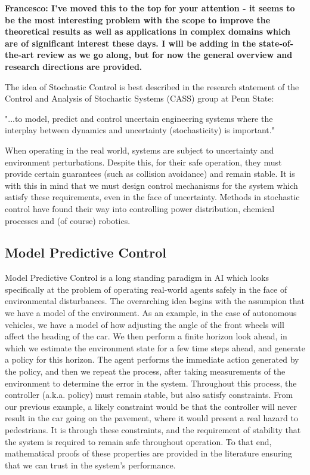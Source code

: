\documentclass[preprint,11pt]{report}
\begin{document}
\textbf{Francesco: I've moved this to the top for your attention - it seems to be the most
interesting problem with the scope to improve the theoretical results as well as applications in
complex domains which are of significant interest these days. I will be adding in the
state-of-the-art review as we go along, but for now the general overview and research directions
are provided.}

The idea of Stochastic Control is best described in the research statement of the Control and
Analysis of Stochastic Systems (CASS) group at Penn State:

\begin{displayquote}
	"...to model, predict and control uncertain engineering systems where the interplay between
	dynamics and uncertainty (stochasticity) is important."
\end{displayquote}

When operating in the real world, systems are subject to uncertainty and environment perturbations.
Despite this, for their safe operation, they must provide certain guarantees (such as collision
avoidance) and remain stable. It is with this in mind that we must design control mechanisms for the
system which satisfy these requirements, even in the face of uncertainty. Methods in stochastic
control have found their way into controlling power distribution, chemical processes and (of course)
robotics. 

\subsection*{Model Predictive Control}

Model Predictive Control is a long standing paradigm in AI which looks specifically at the problem
of operating real-world agents safely in the face of environmental disturbances. The overarching
idea begins with the assumpion that we have a model of the environment. As an example, in
the case of autonomous vehicles, we have a model of how adjusting the angle of the front wheels will
affect the heading of the car. We then perform a finite horizon look ahead, in which we estimate the
environment state for a few time steps ahead, and generate a policy for this horizon. The agent
performs the immediate action generated by the policy, and then we repeat the process, after taking
measurements of the environment to determine the error in the system. Throughout this process, the
controller (a.k.a. policy) must remain stable, but also satisfy constraints. From our previous
example, a likely constraint would be that the controller will never result in the car going on the
pavement, where it would present a real hazard to pedestrians. It is through these constraints, and
the requirement of stability that the system is required to remain safe throughout operation. To
that end, mathematical proofs of these properties are provided in the literature ensuring that we
can trust in the system's performance.
\end{document}
